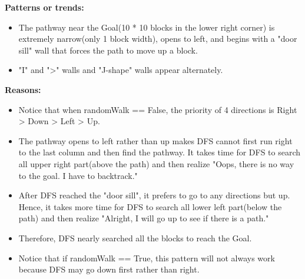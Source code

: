 \documentclass[letter]{article}
\begin{document}
\begin{enumerate}[resume]
\begin{enumerate}
\begin{enumerate}
				\textbf{Patterns or trends:} 
				\begin{itemize}
					\item {The pathway near the Goal(10 * 10 blocks in the lower right corner) is extremely narrow(only 1 block width), opens to left, and begins with a "door sill" wall that forces the path to move up a block.}
					
					\item {"I" and ">" walls and "J-shape" walls appear alternately.}
				\end{itemize}
				
				\textbf{Reasons:} 
				\begin{itemize}
					\item {Notice that when randomWalk == False, the priority of 4 directions is Right > Down > Left > Up.}
					\item {The pathway opens to left rather than up makes DFS cannot first run right to the last column and then find the pathway. It takes time for DFS to search all upper right part(above the path) and then realize "Oops, there is no way to the goal. I have to backtrack."}
					\item {After DFS reached the "door sill", it prefers to go to any directions but up. Hence, it takes more time for DFS to search all lower left part(below the path) and then realize "Alright, I will go up to see if there is a path."}
					\item {Therefore, DFS nearly searched all the blocks to reach the Goal.}
					\item {Notice that if randomWalk == True, this pattern will not always work because DFS may go down first rather than right.}
				\end{itemize}
				

\end{enumerate}
\end{enumerate}
\end{enumerate}
\end{document}
